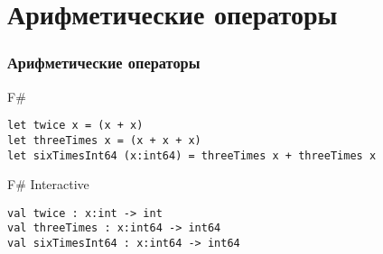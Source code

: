 \documentclass[xetex,mathserif,serif]{beamer}
\begin{document}
	\section{Арифметические операторы}

	\begin{frame}[fragile]
		\frametitle{Арифметические операторы}
		\begin{exampleblock}{F\#}
			\begin{lstlisting}
let twice x = (x + x)
let threeTimes x = (x + x + x)
let sixTimesInt64 (x:int64) = threeTimes x + threeTimes x
\end{lstlisting}
\end{exampleblock}

\begin{alertblock}{F\# Interactive}
\begin{lstlisting}[keywordstyle=\color{black}]
val twice : x:int -> int
val threeTimes : x:int64 -> int64
val sixTimesInt64 : x:int64 -> int64
\end{lstlisting}
\end{alertblock}
\end{frame}
\end{document}
